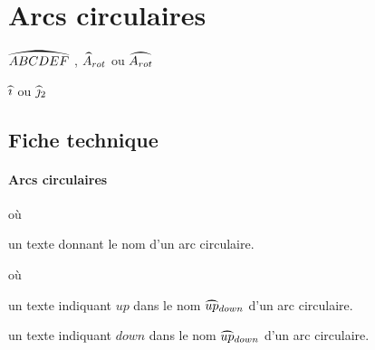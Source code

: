 \documentclass[12pt,a4paper]{article}
\begin{document}

\section{Arcs circulaires}

\newparaexample{}

\begin{latexex}
$\circarc{ABCDEF}$ ,
$\circarc*{A}{rot}$ ou
$\circarc{A_{rot}}$
\end{latexex}




\newparaexample{}

\begin{latexex}
$\circarc{i}$ ou
$\circarc*{j}{2}$
\end{latexex}




\subsection{Fiche technique}

\paragraph{Arcs circulaires}

 où \quad {}

\IDarg{} un texte donnant le nom d'un arc circulaire.


\separation


 où \quad {}

 un texte indiquant $up$ dans le nom $\circarc*{up}{down}$ d'un arc circulaire.

 un texte indiquant $down$ dans le nom $\circarc*{up}{down}$ d'un arc circulaire.
\end{document}
